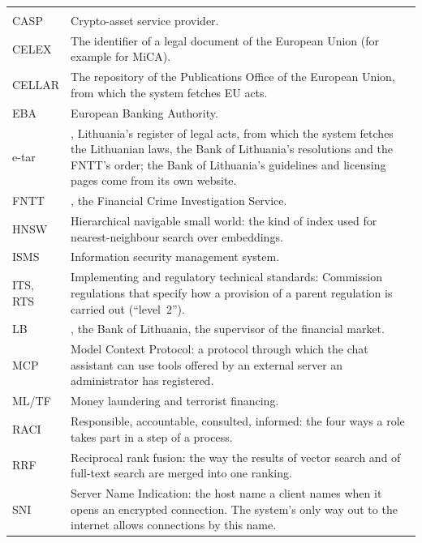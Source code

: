 \begin{xltabular}{\textwidth}{@{}L{24mm}Y@{}}
\toprule
{} &  \\
\midrule
\endfirsthead
\toprule
{} &  \\
\midrule
\endhead
\bottomrule
\endlastfoot
CASP & Crypto-asset service provider. \\
CELEX & The identifier of a legal document of the European Union (for example
   for MiCA). \\
CELLAR & The repository of the Publications Office of the European Union, from which the
  system fetches EU acts. \\
EBA & European Banking Authority. \\
e-tar & , Lithuania's register of legal acts, from which the system
  fetches the Lithuanian laws, the Bank of Lithuania's resolutions and the FNTT's order; the
  Bank of Lithuania's guidelines and licensing pages come from its own website. \\
FNTT & , the Financial Crime Investigation Service. \\
HNSW & Hierarchical navigable small world: the kind of index used for nearest-neighbour search
  over embeddings. \\
ISMS & Information security management system. \\
ITS, RTS & Implementing and regulatory technical standards: Commission regulations that
  specify how a provision of a parent regulation is carried out (\enquote{level~2}). \\
LB & , the Bank of Lithuania, the supervisor of the financial market. \\
MCP & Model Context Protocol: a protocol through which the chat assistant can use tools
  offered by an external server an administrator has registered. \\
ML/TF & Money laundering and terrorist financing. \\
RACI & Responsible, accountable, consulted, informed: the four ways a role takes part in a
  step of a process. \\
RRF & Reciprocal rank fusion: the way the results of vector search and of full-text search are
  merged into one ranking. \\
SNI & Server Name Indication: the host name a client names when it opens an encrypted
  connection. The system's only way out to the internet allows connections by this name. \\
\end{xltabular}
